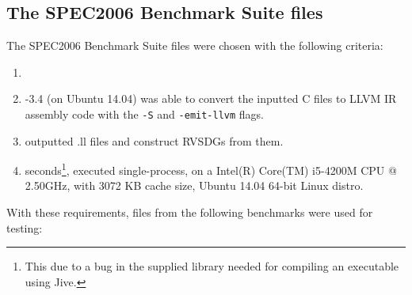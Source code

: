 \subsection{The SPEC2006 Benchmark Suite files}
\label{sub:meth:SPEC2006_files}

The SPEC2006 Benchmark Suite files were chosen with the following criteria:

\begin{enumerate}
	\item {}

	\item {}-3.4 (on Ubuntu 14.04) was able to convert the inputted C files
to LLVM IR assembly code with the \lstinline!-S! and \lstinline!-emit-llvm!
flags.

	\item {}
outputted .ll files and construct RVSDGs from them.

	\item {}
seconds\footnote{This due to a bug in the supplied library needed for compiling
an executable using Jive.}, executed single-process, on a Intel(R) Core(TM)
i5-4200M CPU @ 2.50GHz, with 3072 KB cache size, Ubuntu 14.04 64-bit Linux
distro.
\end{enumerate}

With these requirements, files from the following benchmarks were used for
testing:

